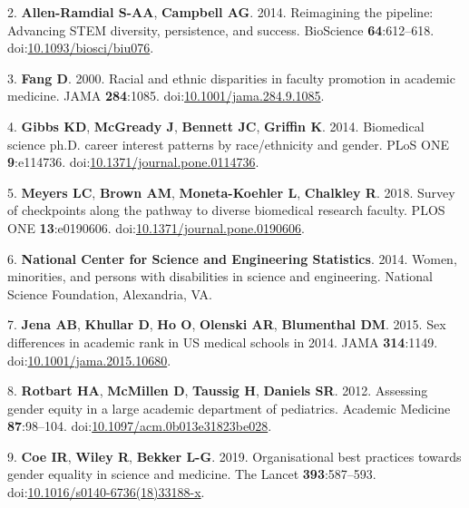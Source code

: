 \documentclass[10pt,]{article}
\begin{document}
\hypertarget{ref-AllenRamdial2014}{}
2. \textbf{Allen-Ramdial S-AA}, \textbf{Campbell AG}. 2014. Reimagining
the pipeline: Advancing STEM diversity, persistence, and success.
BioScience \textbf{64}:612--618.
doi:\href{https://doi.org/10.1093/biosci/biu076}{10.1093/biosci/biu076}.

\hypertarget{ref-Fang2000}{}
3. \textbf{Fang D}. 2000. Racial and ethnic disparities in faculty
promotion in academic medicine. JAMA \textbf{284}:1085.
doi:\href{https://doi.org/10.1001/jama.284.9.1085}{10.1001/jama.284.9.1085}.

\hypertarget{ref-Gibbs2014}{}
4. \textbf{Gibbs KD}, \textbf{McGready J}, \textbf{Bennett JC},
\textbf{Griffin K}. 2014. Biomedical science ph.D. career interest
patterns by race/ethnicity and gender. PLoS ONE \textbf{9}:e114736.
doi:\href{https://doi.org/10.1371/journal.pone.0114736}{10.1371/journal.pone.0114736}.

\hypertarget{ref-Meyers2018}{}
5. \textbf{Meyers LC}, \textbf{Brown AM}, \textbf{Moneta-Koehler L},
\textbf{Chalkley R}. 2018. Survey of checkpoints along the pathway to
diverse biomedical research faculty. PLOS ONE \textbf{13}:e0190606.
doi:\href{https://doi.org/10.1371/journal.pone.0190606}{10.1371/journal.pone.0190606}.

\hypertarget{ref-nsf_2014}{}
6. \textbf{National Center for Science and Engineering Statistics}.
2014. Women, minorities, and persons with disabilities in science and
engineering. National Science Foundation, Alexandria, VA.

\hypertarget{ref-Jena2015}{}
7. \textbf{Jena AB}, \textbf{Khullar D}, \textbf{Ho O}, \textbf{Olenski
AR}, \textbf{Blumenthal DM}. 2015. Sex differences in academic rank in
US medical schools in 2014. JAMA \textbf{314}:1149.
doi:\href{https://doi.org/10.1001/jama.2015.10680}{10.1001/jama.2015.10680}.

\hypertarget{ref-Rotbart2012}{}
8. \textbf{Rotbart HA}, \textbf{McMillen D}, \textbf{Taussig H},
\textbf{Daniels SR}. 2012. Assessing gender equity in a large academic
department of pediatrics. Academic Medicine \textbf{87}:98--104.
doi:\href{https://doi.org/10.1097/acm.0b013e31823be028}{10.1097/acm.0b013e31823be028}.

\hypertarget{ref-Coe2019}{}
9. \textbf{Coe IR}, \textbf{Wiley R}, \textbf{Bekker L-G}. 2019.
Organisational best practices towards gender equality in science and
medicine. The Lancet \textbf{393}:587--593.
doi:\href{https://doi.org/10.1016/s0140-6736(18)33188-x}{10.1016/s0140-6736(18)33188-x}.
\end{document}
